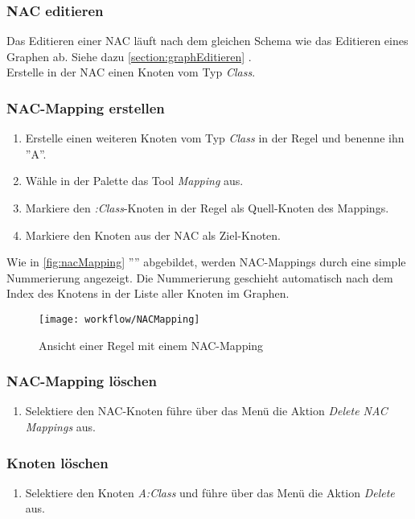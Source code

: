 		\subsubsection{NAC editieren}
		Das Editieren einer NAC läuft nach dem gleichen Schema wie das Editieren eines Graphen ab. Siehe dazu \ref{section:graphEditieren} .\\
		Erstelle in der NAC einen Knoten vom Typ \textit{Class}.
				
		\subsubsection{NAC-Mapping erstellen}
			\begin{enumerate}
				\item Erstelle einen weiteren Knoten vom Typ \textit{Class} in der Regel und benenne ihn ''A''.
				\item Wähle in der Palette das Tool \textit{Mapping} aus.
				\item Markiere den \textit{:Class}-Knoten in der Regel als Quell-Knoten des Mappings.
				\item Markiere den Knoten aus der NAC als Ziel-Knoten.
			\end{enumerate}
		
			Wie in \autoref{fig:nacMapping} '''' abgebildet, werden NAC-Mappings durch eine simple Nummerierung angezeigt. Die Nummerierung geschieht automatisch nach dem Index des Knotens in der Liste aller Knoten im Graphen.
			
			\begin{figure}[h!] %
				\centering
				\texttt{[image: workflow/NACMapping]}
				\caption{Ansicht einer Regel mit einem NAC-Mapping}
				\label{fig:nacMapping}
			\end{figure}
			
		\subsubsection{NAC-Mapping löschen}	
		\begin{enumerate}
			\item Selektiere den NAC-Knoten führe über das Menü die Aktion \textit{Delete NAC Mappings} aus.
		\end{enumerate}
		
		\subsubsection{Knoten löschen}
		\begin{enumerate}
			\item Selektiere den Knoten \textit{A:Class} und führe über das Menü die Aktion \textit{Delete} aus.
		\end{enumerate}

